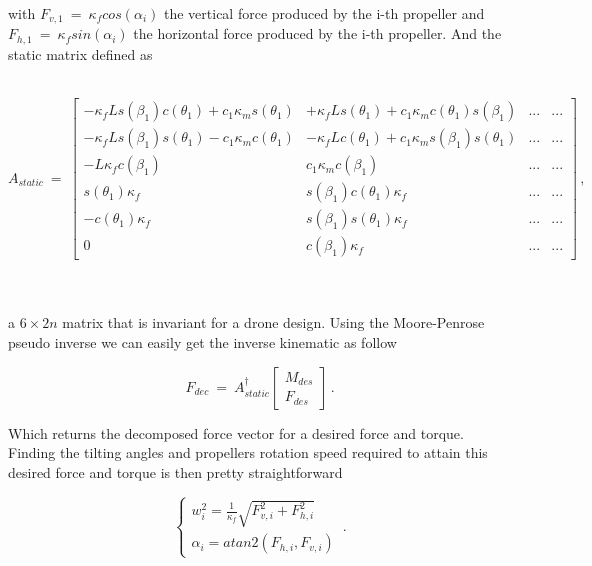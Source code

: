 with $F_{v,1}\ = \ \kappa_f cos(\alpha_i)$ the vertical force produced by the i-th
propeller and $F_{h,1}\ = \ \kappa_f sin(\alpha_i)$ the horizontal force produced
by the i-th propeller. And the static matrix defined as\\\\
\centerline{\begingroup
    \fontsize{9pt}{11pt}\selectfont
$A_{static} \ = \
\begin{bmatrix}
      -\kappa_f L s(\beta_1) c(\theta_1) +c_1\kappa_m s(\theta_1)  &
      + \kappa_f L s(\theta_1) +c_1 \kappa_m c(\theta_1) s(\beta_1)  & ... & ...\\
      -\kappa_f L s(\beta_1) s(\theta_1) - c_1 \kappa_m c(\theta_1) &
      -\kappa_f L c(\theta_1) +c_1 \kappa_m s(\beta_1) s(\theta_1)  & ... & ...\\
      -L \kappa_f c(\beta_1) & c_1 \kappa_m c(\beta_1)  & ... & ...\\
      s(\theta_1) \kappa_f & s(\beta_1) c(\theta_1) \kappa_f & ... & ...\\
      -c(\theta_1) \kappa_f  & s(\beta_1) s(\theta_1) \kappa_f & ... & ...\\
      0 & c(\beta_1) \kappa_f  & ... & ...
\end{bmatrix}\, ,$
\endgroup}\\\\
a $6 \times 2n$ matrix that is invariant for a drone design. Using the Moore-Penrose
pseudo inverse we can easily get the inverse kinematic as follow

\begin{equation}
  \label{inverse_kin}
  F_{dec}  \ = \ A_{static}^{\dagger}
    \begin{bmatrix}
      M_{des} \\
      F_{des}
    \end{bmatrix}
    \, .
\end{equation}

Which returns the decomposed force vector for a desired force and torque. Finding
the tilting angles and propellers rotation speed required to attain this desired
force and torque is then pretty straightforward

\begin{equation}
  \label{decomposition}
  \begin{cases}
    w_i^2 = \frac{1}{\kappa_f} \sqrt{F_{v,i}^2 + F_{h,i}^2} \\
    \alpha_i = atan2(F_{h,i},F_{v,i})
  \end{cases}\, .
\end{equation}

